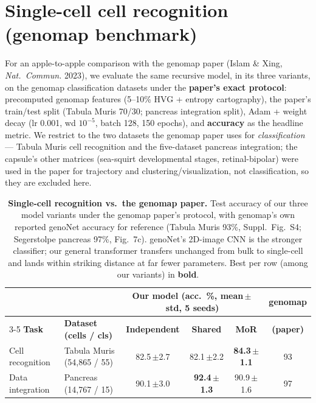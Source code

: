 \documentclass[11pt]{article}
\newcommand{\best}[1]{\textbf{#1}}
\begin{document}
\clearpage
\section*{Single-cell cell recognition (genomap benchmark)}
\normalsize
For an apple-to-apple comparison with the genomap paper (Islam \& Xing,
\emph{Nat.\ Commun.} 2023), we evaluate the same recursive model, in its three
variants, on the genomap classification datasets under the \textbf{paper's exact
protocol}: precomputed genomap features (5--10\% HVG + entropy cartography),
the paper's train/test split (Tabula Muris 70/30; pancreas integration split),
Adam + weight decay (lr 0.001, wd $10^{-5}$, batch 128, 150 epochs), and
\textbf{accuracy} as the headline metric. We restrict to the two datasets the
genomap paper uses for \emph{classification} --- Tabula Muris cell recognition and
the five-dataset pancreas integration; the capsule's other matrices (sea-squirt
developmental stages, retinal-bipolar) were used in the paper for trajectory and
clustering/visualization, not classification, so they are excluded here.

\begin{table}[h]
\centering
\caption{\textbf{Single-cell recognition vs.\ the genomap paper.} Test accuracy of
our three model variants under the genomap paper's protocol, with genomap's own reported
genoNet accuracy for reference (Tabula Muris 93\%, Suppl.\ Fig.~S4; Segerstolpe pancreas
97\%, Fig.~7c). genoNet's 2D-image CNN is the stronger classifier; our general transformer
transfers unchanged from bulk to single-cell and lands within striking distance at far fewer
parameters. Best per row (among our variants) in \textbf{bold}.}
\label{tab:singlecell}
\setlength{\tabcolsep}{6pt}
\footnotesize
\begin{tabular}{l l c c c c}
\toprule
& & \multicolumn{3}{c}{\textbf{Our model (acc.\ \%, mean\,$\pm$\,std, 5 seeds)}} & \textbf{genomap} \\
\cmidrule(lr){3-5}
\textbf{Task} & \textbf{Dataset (cells / cls)} &
\textbf{Independent} & \textbf{Shared} & \textbf{MoR} & \textbf{(paper)} \\
\midrule
Cell recognition  & Tabula Muris (54{,}865 / 55) & 82.5\,{\footnotesize$\pm$2.7} & 82.1\,{\footnotesize$\pm$2.2} & \best{84.3\,{\footnotesize$\pm$1.1}} & 93 \\
Data integration  & Pancreas (14{,}767 / 15)     & 90.1\,{\footnotesize$\pm$3.0} & \best{92.4\,{\footnotesize$\pm$1.3}} & 90.9\,{\footnotesize$\pm$1.6} & 97 \\
\bottomrule
\end{tabular}
\end{table}
\end{document}
